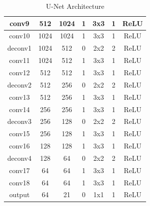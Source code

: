\begin{table}[htbp]
\begin{tabular}{|c|c|c|c|c|c|c|}
		conv9          & 512         & 1024         & 1                & 3x3             & 1               & ReLU                \\ \hline
		conv10         & 1024        & 1024         & 1                & 3x3             & 1               & ReLU                \\ \hline
		deconv1        & 1024        & 512          & 0                & 2x2             & 2               & ReLU                \\ \hline
		conv11         & 1024        & 512          & 1                & 3x3             & 1               & ReLU                \\ \hline
		conv12         & 512         & 512          & 1                & 3x3             & 1               & ReLU                \\ \hline
		deconv2        & 512         & 256          & 0                & 2x2             & 2               & ReLU                \\ \hline
		conv13         & 512         & 256          & 1                & 3x3             & 1               & ReLU                \\ \hline
		conv14         & 256         & 256          & 1                & 3x3             & 1               & ReLU                \\ \hline
		deconv3        & 256         & 128          & 0                & 2x2             & 2               & ReLU                \\ \hline
		conv15         & 256         & 128          & 1                & 3x3             & 1               & ReLU                \\ \hline
		conv16         & 128         & 128          & 1                & 3x3             & 1               & ReLU                \\ \hline
		deconv4        & 128         & 64           & 0                & 2x2             & 2               & ReLU                \\ \hline
		conv17         & 64          & 64           & 1                & 3x3             & 1               & ReLU                \\ \hline
		conv18         & 64          & 64           & 1                & 3x3             & 1               & ReLU                \\ \hline
		output         & 64          & 21           & 0                & 1x1             & 1               & ReLU                \\ \hline
	\end{tabular}
	\caption{U-Net Architecture}
\end{table}

